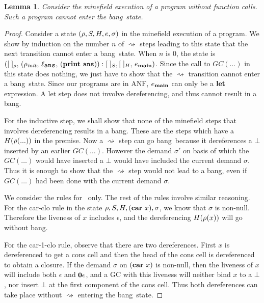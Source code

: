 \documentclass[9pt,preprint,nonatbib]{sigplanconf}
\newcommand{\bang}{\mbox{\sc bang}}
\newtheorem{lemma}[theorem]{Lemma}
\begin{document}
\begin{lemma}
\label{lemma:call-less-cannot-go-bang}
Consider the minefield execution of  a program without function calls.
Such a program cannot enter the \bang\ state.
\end{lemma}
\begin{proof}
Consider a  state  $(\rho,  S,  H,  e, \sigma)$  in  the
minefield execution of a program.  We  show by induction on the number $n$
of $\rightsquigarrow$ steps  leading to  this state  that the next  transition cannot
enter a  \bang\ state.   When $n$  is 0,  the state  is $([\;]_\rho,\,
(\rho_\mathit{init},   \,  \ell_{\mathbf{\mbox{\tt ans}}}   ,\,  (\mathbf{print}~\mathbf{\mbox{\tt ans}})):[\;]_{S},
[\;]_{H},\, e_{\mathbf{main}})$.   Since the call  to $GC(\ldots)$ in  this state
does  nothing,  we  just  have to  show  that  the  $\rightsquigarrow$
transition cannot  enter a  \bang\ state.  Since  our programs  are in
ANF, $e_{\mathbf{main}}$ can only be a $\mbox{$\mathbf{ let}$}$ expression.  A {\sc let} step
does not involve dereferencing, and thus cannot result in a \bang.

For the inductive step, we shall show that none of the minefield steps
that involves dereferencing  results in a \bang.  These  are the steps
which   have   a   $H(\rho(...))$   in   the   premise.    Now   a
$\rightsquigarrow$ step can go \bang\ because it dereferences a $\bot$
inserted by an earlier $GC(\ldots)$.   However the demand $\sigma'$  on basis of
which the $GC(\ldots)$ would have inserted a  $\bot$ would have
included the  current demand $\sigma$.     Thus it is
enough to  show that the $\rightsquigarrow$ step would not lead to a
\bang, even if $GC(\ldots)$ had been done with the current demand
$\sigma$.

We consider the rules for \CAR\  only.  
The rest  of the rules involve similar reasoning. For the {\sc
  car-clo}  rule in  the state  $\rho, S,  H, (\mbox{$\mathbf{car}$}~x),
\sigma$, we  know that $\sigma$ is  non-null. Therefore
the  liveness  of  $x$  includes  $\epsilon$,  and  the
dereferencing $H(\rho(x))$ will go without \bang.

For the  {\sc car-1-clo}  rule, observe that  there are
two dereferences.  First $x$  is dereferenced to  get a
cons  cell  and then  the  head  of  the cons  cell  is
dereferenced  to  obtain  a  closure.   If  the  demand
$\sigma$ on  $(\mbox{$\mathbf{car}$}~x)$ is non-null, then  the liveness
of    $x$   will    include    both   $\epsilon$    and
$\mathbf{0}\epsilon$,  and  a  GC with  this  liveness  will
neither bind $x$ to a  $\bot$, nor insert $\bot$ at the
first   component  of   the   cons   cell.  Thus   both
dereferences    can take place without 
$\rightsquigarrow$ entering the   \bang\ state.
\end{proof} 
\end{document}
